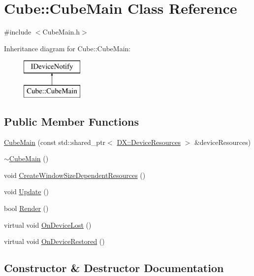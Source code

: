 \hypertarget{class_cube_1_1_cube_main}{}\section{Cube\+:\+:Cube\+Main Class Reference}
\label{class_cube_1_1_cube_main}


{\ttfamily \#include $<$Cube\+Main.\+h$>$}

Inheritance diagram for Cube\+:\+:Cube\+Main\+:\begin{figure}[H]
\begin{center}
\leavevmode
\includegraphics[height=2.000000cm]{class_cube_1_1_cube_main}
\end{center}
\end{figure}
\subsection*{Public Member Functions}
\begin{DoxyCompactItemize}
\item 
\hyperlink{class_cube_1_1_cube_main_a229d8aaeba812925915ff2c7d341ae66}{Cube\+Main} (const std\+::shared\+\_\+ptr$<$ \hyperlink{class_d_x_1_1_device_resources}{D\+X\+::\+Device\+Resources} $>$ \&device\+Resources)
\item 
\hyperlink{class_cube_1_1_cube_main_a81cc083beb265cb02e8ff2e6d7448cf0}{$\sim$\+Cube\+Main} ()
\item 
void \hyperlink{class_cube_1_1_cube_main_a584b21871de3599456d0ae51b8b1f720}{Create\+Window\+Size\+Dependent\+Resources} ()
\item 
void \hyperlink{class_cube_1_1_cube_main_a7011617c118f70dc61bfa265caf3da1a}{Update} ()
\item 
bool \hyperlink{class_cube_1_1_cube_main_a3d07f71ee05a242275b1e3f7e395d8fe}{Render} ()
\item 
virtual void \hyperlink{class_cube_1_1_cube_main_aa0d821cc48fa81986acb05bdf5d763fc}{On\+Device\+Lost} ()
\item 
virtual void \hyperlink{class_cube_1_1_cube_main_a86c314b0955424dec4cbc9734acd08ae}{On\+Device\+Restored} ()
\end{DoxyCompactItemize}


\subsection{Constructor \& Destructor Documentation}
\mbox{\label{class_cube_1_1_cube_main_a229d8aaeba812925915ff2c7d341ae66}} 
